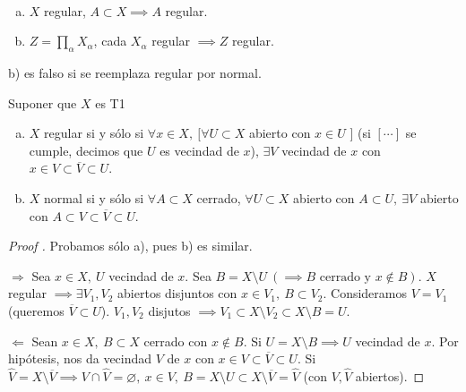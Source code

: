 \begin{property}~
	\begin{enumerate}[a)]
		\item $X$ regular, $A \subset X \implies A$ regular.

		\item $Z = \prod_{\alpha} X_{\alpha}$, cada $X_{\alpha}$ regular $\implies Z$ regular.
	\end{enumerate}
\end{property}

\begin{remark}
	b) es falso si se reemplaza regular por normal.
\end{remark}

\begin{lemma}
	Suponer que $X$ es T1
	\begin{enumerate}[a)]
		\item $X$ regular si y sólo si $\forall x \in X,\ \big[\forall U \subset X$ abierto con $x \in U$ \big] (si $[\cdots]$ se cumple, decimos que $U$ es vecindad de $x$), $\exists V$ vecindad de $x$ con $x \in V \subset \overline{V} \subset U$.

		\item $X$ normal si y sólo si $\forall A \subset X$ cerrado, $\forall U \subset X$ abierto con $A \subset U,\ \exists V$ abierto con $A \subset V \subset \overline{V} \subset U$.
	\end{enumerate}
\end{lemma}
\begin{proof}[Proof ]
	Probamos sólo a), pues b) es similar. \par
	$\boxed{\Rightarrow}$ Sea $x \in X,\ U$ vecindad de $x$. Sea $B = X \setminus U \ (\implies B \text{ cerrado y } x \not\in B)$. $X$ regular $\implies \exists V_{1},V_{2}$ abiertos disjuntos con $x \in V_{1},\ B \subset V_{2}$. Consideramos $V = V_{1}$ (queremos $\overline{V} \subset U$). $V_{1},V_{2}$ disjutos $\implies V_{1} \subset X \setminus V_{2} \subset X \setminus B = U$. \par
	$\boxed{\Leftarrow}$ Sean $x \in X,\ B \subset X$ cerrado con $x \not\in B$. Si $U = X \setminus B \implies U$ vecindad de $x$. Por hipótesis, nos da vecindad $V$ de $x$ con $x \in V \subset \overline{V} \subset U$. Si $\widehat{V} = X \setminus \overline{V} \implies V \cap \widehat{V} = \varnothing,\ x \in V,\ B = X \setminus U \subset X \setminus \overline{V} = \widehat{V}$ (con $V, \widehat{V}$ abiertos).
\end{proof}

